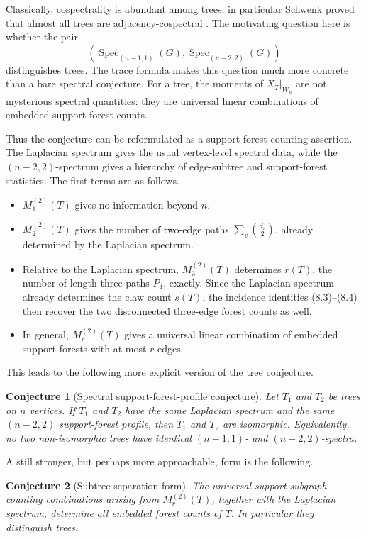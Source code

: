 \documentclass{amsart}
\newtheorem{conjecture}{Conjecture}
\theoremstyle{definition}
\newcommand{\Spec}{\operatorname{Spec}}
\begin{document}
Classically, cospectrality is abundant among trees; in particular Schwenk proved that almost all trees are adjacency-cospectral \cite{Schwenk}.  The motivating question here is whether the pair
\[
\left(
\Spec_{(n-1,1)}(G),
\Spec_{(n-2,2)}(G)
\right)
\]
distinguishes trees.  The trace formula makes this question much more
concrete than a bare spectral conjecture.  For a tree, the moments of
$X_T|_{W_n}$ are not mysterious spectral quantities: they are universal
linear combinations of embedded support-forest counts.

Thus the conjecture can be reformulated as a support-forest-counting assertion.
The Laplacian spectrum gives the usual vertex-level spectral data, while
the $(n-2,2)$-spectrum gives a hierarchy of edge-subtree and support-forest statistics.
The first terms are as follows.

\begin{itemize}[leftmargin=2em]
\item $M_1^{(2)}(T)$ gives no information beyond $n$.
\item $M_2^{(2)}(T)$ gives the number of two-edge paths
$\sum_v\binom{d_v}{2}$, already determined by the Laplacian spectrum.
\item Relative to the Laplacian spectrum, $M_3^{(2)}(T)$ determines
$r(T)$, the number of length-three paths $P_4$, exactly.  Since the
Laplacian spectrum already determines the claw count $s(T)$, the incidence
identities (8.3)--(8.4) then recover the two disconnected three-edge forest
counts as well.
\item In general, $M_r^{(2)}(T)$ gives a universal linear combination of
embedded support forests with at most $r$ edges.
\end{itemize}

This leads to the following more explicit version of the tree conjecture.

\begin{conjecture}[Spectral support-forest-profile conjecture]
Let $T_1$ and $T_2$ be trees on $n$ vertices.  If $T_1$ and $T_2$ have the
same Laplacian spectrum and the same $(n-2,2)$ support-forest profile, then
$T_1$ and $T_2$ are isomorphic.
Equivalently, no two non-isomorphic trees have identical $(n-1,1)$- and
$(n-2,2)$-spectra.
\end{conjecture}

A still stronger, but perhaps more approachable, form is the following.

\begin{conjecture}[Subtree separation form]
The universal support-subgraph-counting combinations arising from
$M_r^{(2)}(T)$, together with the Laplacian spectrum, determine all
embedded forest counts of $T$.  In particular they distinguish trees.
\end{conjecture}
\end{document}
